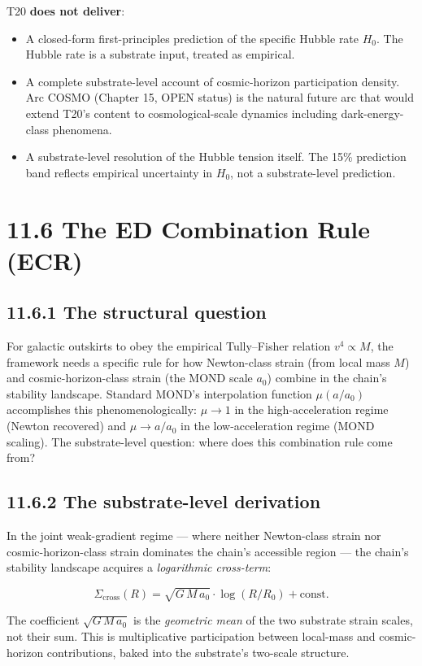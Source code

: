 \documentclass[11pt]{book}
\begin{document}
T20 \textbf{does not deliver}:
\begin{itemize}
\item A closed-form first-principles prediction of the specific Hubble rate $H_0$. The Hubble rate is a substrate input, treated as empirical.
\item A complete substrate-level account of cosmic-horizon participation density. Arc COSMO (Chapter 15, OPEN status) is the natural future arc that would extend T20's content to cosmological-scale dynamics including dark-energy-class phenomena.
\item A substrate-level resolution of the Hubble tension itself. The 15\% prediction band reflects empirical uncertainty in $H_0$, not a substrate-level prediction.
\end{itemize}

\section{11.6 The ED Combination Rule (ECR)}

\subsection{11.6.1 The structural question}

For galactic outskirts to obey the empirical Tully–Fisher relation $v^4 \propto M$, the framework needs a specific rule for how Newton-class strain (from local mass $M$) and cosmic-horizon-class strain (the MOND scale $a_0$) combine in the chain's stability landscape. Standard MOND's interpolation function $\mu(a/a_0)$ accomplishes this phenomenologically: $\mu \to 1$ in the high-acceleration regime (Newton recovered) and $\mu \to a/a_0$ in the low-acceleration regime (MOND scaling). The substrate-level question: where does this combination rule come from?

\subsection{11.6.2 The substrate-level derivation}

In the joint weak-gradient regime — where neither Newton-class strain nor cosmic-horizon-class strain dominates the chain's accessible region — the chain's stability landscape acquires a \textit{logarithmic cross-term}:

\[
\Sigma_\mathrm{cross}(R) = \sqrt{G\,M\,a_0}\cdot\log(R/R_0) + \mathrm{const.}
\]

The coefficient $\sqrt{G\,M\,a_0}$ is the \textit{geometric mean} of the two substrate strain scales, not their sum. This is multiplicative participation between local-mass and cosmic-horizon contributions, baked into the substrate's two-scale structure.
\end{document}
